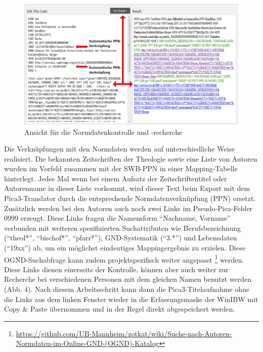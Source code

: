 \documentclass[a4paper,
fontsize=11pt,
oneside,
numbers=noperiodatend,
parskip=half-,
bibliography=totoc,
final
]{scrartcl}
\begin{document}
\begin{figure}[htbp]
\centering
\includegraphics{img/Normdatenkontrolle.jpg}
\caption{Ansicht für die Normdatenkontrolle und -recherche}
\end{figure}

Die Verknüpfungen mit den Normdaten werden auf unterschiedliche Weise
realisiert. Die bekannten Zeitschriften der Theologie sowie eine Liste
von Autoren wurden im Vorfeld zusammen mit der SWB-PPN in einer
Mapping-Tabelle hinterlegt. Jedes Mal wenn bei einem Aufsatz der
Zeitschriftentitel oder Autorenname in dieser Liste vorkommt, wird
dieser Text beim Export mit dem Pica3-Translator durch die entsprechende
Normdatenverknüpfung (PPN) ersetzt. Zusätzlich werden bei den Autoren
auch noch zwei Links im Pseudo-Pica-Felder 0999 erzeugt. Diese Links
fragen die Namensform \enquote{Nachname, Vorname} verbunden mit weiteren
spezifizierten Suchattributen wie Berufsbezeichnung (\enquote{theol*},
\enquote{bischof*}, \enquote{pfarr*}), GND-Systematik (\enquote{3.*})
und Lebensdaten (\enquote{19xx}) ab, um ein möglichst eindeutiges
Mappingergebnis zu erzielen. Diese OGND-Suchabfrage kann zudem
projektspezifisch weiter angepasst \footnote{\url{https://github.com/UB-Mannheim/zotkat/wiki/Suche-nach-Autoren-Normdaten-im-Online-GND-(OGND)-Katalog}}
werden. Diese Links dienen einerseits der Kontrolle, können aber auch
weiter zur Recherche bei verschiedenen Personen mit dem gleichen Namen
benutzt werden (Abb. 4). Nach diesem Arbeitsschritt kann dann die
Pica3-Titelaufnahme ohne die Links aus dem linken Fenster wieder in die
Erfassungsmaske der WinIBW mit Copy \& Paste übernommen und in der Regel
direkt abgespeichert werden.
\end{document}

